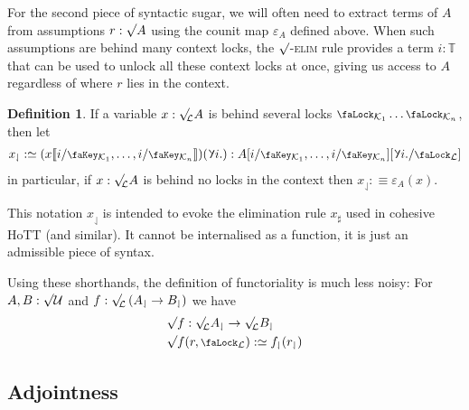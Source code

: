 \documentclass[10pt]{article}
\theoremstyle{definition}
\newtheorem{definition}[theorem]{Definition}
\let\oldequiv\equiv%
\renewcommand{\equiv}{\simeq}
\newcommand{\defeq}{\oldequiv}
\newcommand{\rulen}[1]{\textsc{#1}}
\newcommand*{\univ}{\mathcal{U}}
\newcommand{\lock}{\mathchoice {\scalebox{0.8}{\text{\faLock}}}
  {\scalebox{0.8}{\text{\faLock}}} {\scalebox{0.5}{\text{\faLock}}}
  {\scalebox{0.4}{\text{\faLock}}} }
\newcommand{\key}{\mathchoice
  {\scalebox{0.8}{\text{\faKey}}} {\scalebox{0.8}{\text{\faKey}}}
  {\scalebox{0.5}{\text{\faKey}}} {\scalebox{0.4}{\text{\faKey}}} }
\newcommand{\rbindsym}{\raisebox{-0.5pt}{\scalerel*{\reflectbox{\rotatebox[origin=c]{185}{$\lambda$}}}{\lambda}}}
\newcommand{\rbind}[1]{\rbindsym{} #1.}
\newcommand{\Tiny}{\mathbb{T}}
\newcommand{\lockn}[1]{\mathcal{#1}}
\newcommand{\ctxlocke}[1]{\lock_{#1}}
\newcommand{\ctxlock}[1]{\ctxlocke{\lockn{#1}}}
\newcommand{\stubra}[1]{\llbracket #1 \rrbracket}
\newcommand{\admbra}[1]{[ #1 ]}
\newcommand{\subkeyoe}[2]{#1/\key_{#2}}
\newcommand{\sublock}[2]{\admbra{\rbindsym{} #2. /\lock_{\lockn{#1}} }}
\newcommand{\rformsym}{\surd}
\newcommand{\rforme}[2]{\ThisStyle{\raisebox{0.07em}{$\SavedStyle \rformsym_{\hspace{-0.25em}#1}$}} #2}
\newcommand{\rform}[2]{\rforme{\lockn{#1}}{#2}}
\newcommand{\rformu}[1]{\ThisStyle{\raisebox{0.07em}{$\SavedStyle \rformsym$}} #1}
\newcommand{\rget}[1]{{#1}_{\downharpoonleft}}
\begin{document}
For the second piece of syntactic sugar, we will often need to extract
terms of $A$ from assumptions $r : \rformu{A}$ using the counit map
$\varepsilon_A$ defined above. When such assumptions are behind many
context locks, the \rulen{$\rformsym$-elim} rule provides a term
$i : \Tiny$ that can be used to unlock all these context locks at
once, giving us access to $A$ regardless of where $r$ lies in the
context.
\begin{definition}
  If a variable $x : \rform{L} A$ is behind several locks
  $\ctxlocke{\lockn{K}_1} \dots \ctxlocke{\lockn{K}_n}$, then let
  \begin{align*}
    \rget{x} :\defeq (x \stubra{\subkeyoe{i}{\lockn{K}_1},
    \dots, \subkeyoe{i}{\lockn{K}_n}})(\rbind{i}) : A \admbra{\subkeyoe{i}{\lockn{K}_1},
    \dots, \subkeyoe{i}{\lockn{K}_n}}\sublock{L}{i}
  \end{align*}
  in particular, if $x : \rform{L} A$ is behind no locks in the
  context then $\rget{x} :\defeq \varepsilon_A(x)$.
\end{definition}
This notation $\rget{x}$ is intended to evoke the elimination rule
$x_\sharp$ used in cohesive HoTT (and similar). It cannot be
internalised as a function, it is just an admissible piece of syntax.

Using these shorthands, the definition of functoriality is much less
noisy: For $A,B : \rformu \univ$ and
$f : \rform{L}\left(\rget{A} \to \rget{B}\right)$ we have
\begin{align*}
  &\rformu f : \rform{L}\rget{A} \to \rform{L}\rget{B} \\
  &\rformu f(r, \ctxlock{L}) :\defeq \rget{f}(\rget{r})
\end{align*}

\subsection{Adjointness}\label{sec:adjointness}
\end{document}
